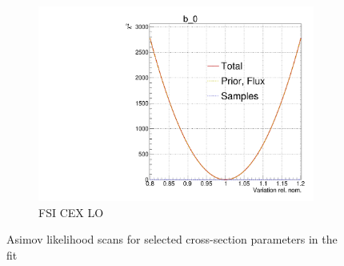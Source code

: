 \begin{figure}[!h]
\begin{subfigure}[t]{0.32\textwidth}
		\includegraphics[width=\textwidth, trim={0mm 0mm 0mm 11mm}, clip,page=105]{figures/mach3/Asimov/Full_LLHscan_18July_BeRPA_U_ND280logL_scan}
		\caption{FSI CEX LO}
	\end{subfigure}
	\caption{Asimov likelihood scans for selected cross-section parameters in the fit}
	\label{fig:xsec_asimov}
\end{figure}

